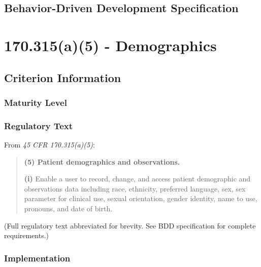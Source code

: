 \section{Behavior-Driven Development Specification}




\chapter{\textsection{} 170.315(a)(5) - Demographics}
\label{chap:a5}


\section{Criterion Information}

\subsection{Maturity Level}

\subsection{Regulatory Text}

From \textit{45 CFR \textsection{} 170.315(a)(5)}:

\begin{quotation}
\textbf{(5) Patient demographics and observations.}

\textbf{(i)} Enable a user to record, change, and access patient demographic and observations data including race, ethnicity, preferred language, sex, sex parameter for clinical use, sexual orientation, gender identity, name to use, pronouns, and date of birth.
\end{quotation}

(Full regulatory text abbreviated for brevity. See BDD specification for complete requirements.)

\subsection{Implementation}

